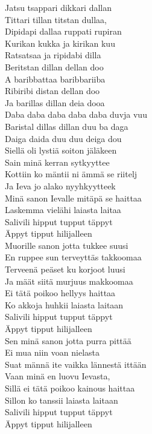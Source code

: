 \begin{flushleft}
Jatsu tsappari dikkari dallan\\
Tittari tillan titstan dullaa,\\
Dipidapi dallaa ruppati rupiran\\
Kurikan kukka ja kirikan kuu\\
\hop
Ratsatsaa ja ripidabi dilla\\
Beritstan dillan dellan doo\\
A baribbattaa baribbariiba\\
Ribiribi distan dellan doo\\
Ja barillas dillan deia dooa\\
Daba daba daba daba daba duvja vuu\\
Baristal dillas dillan duu ba daga\\
Daiga daida duu duu deiga dou\\
\hop
Siellä oli lystiä soiton jäläkeen\\
Sain minä kerran sytkyyttee\\
Kottiin ko mäntii ni ämmä se riitelj\\
Ja Ieva jo alako nyyhkyytteek\\
Minä sanon Ievalle mitäpä se haittaa\\
Laskemma vielähi laiasta laitaa\\
Salivili hipput tupput täppyt\\
Äppyt tipput hilijalleen\\
\hop
Muorille sanon jotta tukkee suusi\\
En ruppee sun terveyttäs takkoomaa\\
Terveenä peäset ku korjoot luusi\\
Ja määt siitä murjuus makkoomaa\\
Ei tätä poikoo hellyys haittaa\\
Ko akkoja huhkii laiasta laitaan\\
Salivili hipput tupput täppyt\\
Äppyt tipput hilijalleen\\
\hop
Sen minä sanon jotta purra pittää\\
Ei mua niin voan nielasta\\
Suat männä ite vaikka lännestä ittään\\
Vaan minä en luovu Ievasta,\\
Sillä ei tätä poikoo kainous haittaa\\
Sillon ko tanssii laiasta laitaan\\
Salivili hipput tupput täppyt\\
Äppyt tipput hilijalleen

\end{flushleft}
\newpage